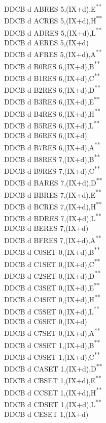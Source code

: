 \documentclass[twoside,openright,a4paper]{book}
\newcommand{\UNDOC}{\textnormal{\textsuperscript{**}}}
\begin{document}
\begin{multicols}{3}
{\begin{tabbing}
	DDCB d AB\>RES 5,(IX+d),E\UNDOC\\
	DDCB d AC\>RES 5,(IX+d),H\UNDOC\\
	DDCB d AD\>RES 5,(IX+d),L\UNDOC\\
	DDCB d AE\>RES 5,(IX+d)\\
	DDCB d AF\>RES 5,(IX+d),A\UNDOC\\
	DDCB d B0\>RES 6,(IX+d),B\UNDOC\\
	DDCB d B1\>RES 6,(IX+d),C\UNDOC\\
	DDCB d B2\>RES 6,(IX+d),D\UNDOC\\
	DDCB d B3\>RES 6,(IX+d),E\UNDOC\\
	DDCB d B4\>RES 6,(IX+d),H\UNDOC\\
	DDCB d B5\>RES 6,(IX+d),L\UNDOC\\
	DDCB d B6\>RES 6,(IX+d)\\
	DDCB d B7\>RES 6,(IX+d),A\UNDOC\\
	DDCB d B8\>RES 7,(IX+d),B\UNDOC\\
	DDCB d B9\>RES 7,(IX+d),C\UNDOC\\
	DDCB d BA\>RES 7,(IX+d),D\UNDOC\\
	DDCB d BB\>RES 7,(IX+d),E\UNDOC\\
	DDCB d BC\>RES 7,(IX+d),H\UNDOC\\
	DDCB d BD\>RES 7,(IX+d),L\UNDOC\\
	DDCB d BE\>RES 7,(IX+d)\\
	DDCB d BF\>RES 7,(IX+d),A\UNDOC\\
	DDCB d C0\>SET 0,(IX+d),B\UNDOC\\
	DDCB d C1\>SET 0,(IX+d),C\UNDOC\\
	DDCB d C2\>SET 0,(IX+d),D\UNDOC\\
	DDCB d C3\>SET 0,(IX+d),E\UNDOC\\
	DDCB d C4\>SET 0,(IX+d),H\UNDOC\\
	DDCB d C5\>SET 0,(IX+d),L\UNDOC\\
	DDCB d C6\>SET 0,(IX+d)\\
	DDCB d C7\>SET 0,(IX+d),A\UNDOC\\
	DDCB d C8\>SET 1,(IX+d),B\UNDOC\\
	DDCB d C9\>SET 1,(IX+d),C\UNDOC\\
	DDCB d CA\>SET 1,(IX+d),D\UNDOC\\
	DDCB d CB\>SET 1,(IX+d),E\UNDOC\\
	DDCB d CC\>SET 1,(IX+d),H\UNDOC\\
	DDCB d CD\>SET 1,(IX+d),L\UNDOC\\
	DDCB d CE\>SET 1,(IX+d)\\

\end{tabbing}}
\end{multicols}
\end{document}
